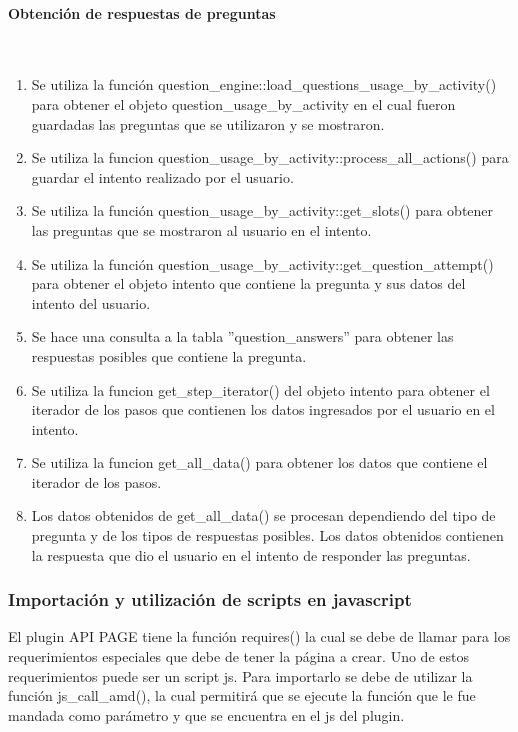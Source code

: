 		\paragraph{Obtención de respuestas de preguntas}\mbox{}\\

    \begin{enumerate}

			\item Se utiliza la función question\_engine::load\_questions\_usage\_by\_activity() para obtener el objeto question\_usage\_by\_activity en el cual fueron guardadas las preguntas que se utilizaron y se mostraron.
			\item Se utiliza la funcion question\_usage\_by\_activity::process\_all\_actions() para guardar el intento realizado por el usuario.
			\item Se utiliza la función question\_usage\_by\_activity::get\_slots() para obtener las preguntas que se mostraron al usuario en el intento.
			\item Se utiliza la función question\_usage\_by\_activity::get\_question\_attempt() para obtener el objeto intento que contiene la pregunta y sus datos del intento del usuario.
			\item Se hace una consulta a la tabla ''question\_answers'' para obtener las respuestas posibles que contiene la pregunta.
			\item Se utiliza la funcion get\_step\_iterator() del objeto intento para obtener el iterador de los pasos que contienen los datos ingresados por el usuario en el intento.
			\item Se utiliza la funcion get\_all\_data() para obtener los datos que contiene el iterador de los pasos.
			\item Los datos obtenidos de get\_all\_data() se procesan dependiendo del tipo de pregunta y de los tipos de respuestas posibles. Los datos obtenidos contienen la respuesta que dio el usuario en el intento de responder las preguntas.
    \end{enumerate}

    \subsubsection{Importación y utilización de scripts en javascript}

		El plugin API PAGE tiene la función requires() la cual se debe de llamar para los requerimientos especiales que debe de tener la página a crear. Uno de estos requerimientos puede ser un script js. Para importarlo se debe de utilizar la función js\_call\_amd(), la cual permitirá que se ejecute la función que le fue mandada como parámetro y que se encuentra en el js del plugin.

